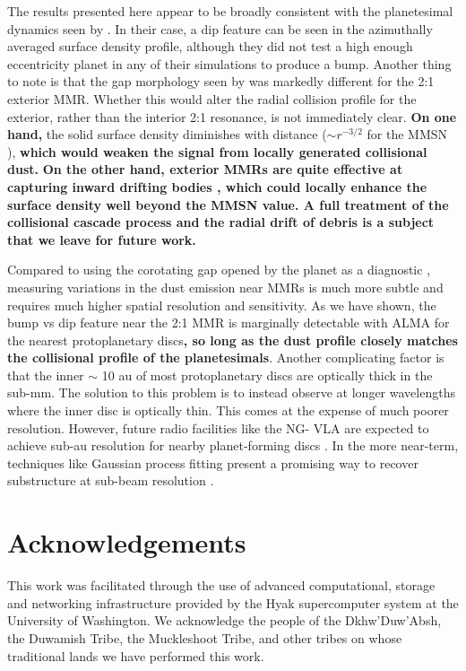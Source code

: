 \documentclass[fleqn,usenatbib]{mnras}
\begin{document}
The results presented here appear to be broadly consistent with the planetesimal dynamics seen by \citet{2016ApJ...818..159T}. In their case, a dip 
feature can be seen in the azimuthally averaged surface density profile, although they did not test a high enough eccentricity planet in any of their 
simulations to produce a bump. Another thing to note is that the gap morphology seen by \citet{2016ApJ...818..159T} was markedly different for the 
2:1 exterior MMR. Whether this would alter the radial collision profile for the exterior, rather than the interior 2:1 resonance, is not immediately clear.  
\textbf{On one hand,} the solid surface density diminishes with distance ($\sim r^{-3/2}$ for the MMSN \citep{1981PThPS..70...35H}), \textbf{which would weaken the signal from locally 
generated collisional dust.} \textbf{On the other hand, exterior MMRs are quite effective at capturing inward drifting bodies \citep{1985Icar...62...16W}, which could locally enhance the 
surface density well beyond the MMSN value. A full treatment of the collisional cascade process and the radial drift of debris is a subject that we leave for future work.}

Compared to using the corotating gap opened by the planet as a diagnostic \citep{2013ApJ...777L..31D, 2016ApJ...820...29D}, measuring 
variations in the dust emission near MMRs is much more subtle and requires much higher spatial resolution and sensitivity. As we have shown, the 
bump vs dip feature near the 2:1 MMR is marginally detectable with ALMA for the nearest protoplanetary discs\textbf{, so long as the dust profile closely matches the collisional profile of 
the planetesimals}. Another complicating factor is that 
the inner $\sim$ 10 au of most protoplanetary discs are optically thick in the sub-mm. The solution to this problem is to instead observe at longer 
wavelengths where the inner disc is optically thin. This comes at the expense of much poorer resolution. However, future radio facilities like the NG-
VLA are expected to achieve sub-au resolution for nearby planet-forming discs \citep{2018ASPC..517..147R}. In the more near-term, techniques 
like Gaussian process fitting present a promising way to recover substructure at sub-beam resolution \citep{2020arXiv200507709J}.

\section*{Acknowledgements}
This work was facilitated through the use of advanced computational, storage and networking infrastructure provided by the Hyak supercomputer system at the 
University of Washington. We acknowledge the people of the Dkhw’Duw’Absh, the Duwamish Tribe, the Muckleshoot Tribe, and other tribes on whose traditional 
lands we have performed this work.
\end{document}

